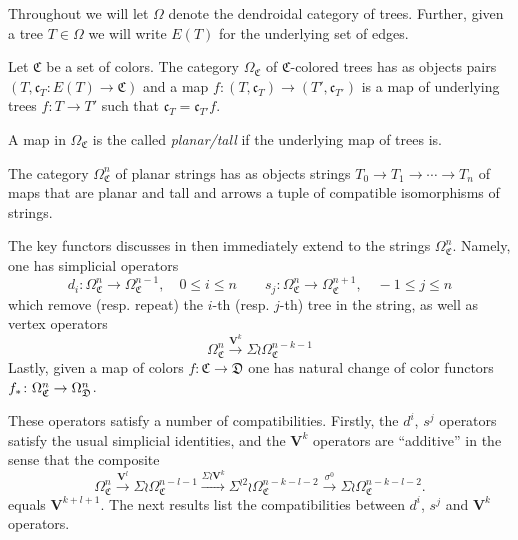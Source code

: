\documentclass[a4paper,10pt
,draft
]{article}%
\renewcommand{\1}{\eta}%
\begin{document}
Throughout we will let $\Omega$ denote the dendroidal category of trees.
Further, given a tree $T\in \Omega$ we will write 
$E(T)$ for the underlying set of edges.

\begin{definition}
Let $\mathfrak{C}$ be a set of colors.
The category $\Omega_{\mathfrak{C}}$ of $\mathfrak{C}$-colored trees has as objects pairs
$(T,\mathfrak{c}_T\colon E(T) \to \mathfrak{C})$ and a map
$f\colon (T,\mathfrak{c}_T) \to (T',\mathfrak{c}_{T'})$
is a map of underlying trees $f\colon T \to T'$
such that $\mathfrak{c}_T = \mathfrak{c}_{T'} f$.

A map in $\Omega_{\mathfrak{C}}$ is the called \textit{planar/tall} if the underlying map of trees is.

The category $\Omega_{\mathfrak{C}}^n$ of planar strings has as objects strings $T_0 \to T_1 \to \cdots \to T_n$ of maps that are planar and tall and arrows a tuple of compatible isomorphisms of strings.
\end{definition}


The key functors discusses in \cite{BP_geo} then immediately extend to the strings
$\Omega_{\mathfrak{C}}^n$. Namely, one has simplicial operators
\[
d_i \colon \Omega_{\mathfrak{C}}^n \to \Omega_{\mathfrak{C}}^{n-1},
\quad 0 \leq i \leq n
\qquad
s_j \colon \Omega_{\mathfrak{C}}^{n} \to \Omega_{\mathfrak{C}}^{n+1},
\quad -1 \leq j \leq n
\]
which remove (resp. repeat) the $i$-th (resp. $j$-th) tree in the string,
as well as vertex operators
\[
\Omega^{n}_{\mathfrak{C}}
\xrightarrow{\boldsymbol{V}^k}
\Sigma \wr \Omega^{n-k-1}_{\mathfrak{C}}
\]
Lastly, given a map of colors 
$f \colon \mathfrak{C} \to \mathfrak{D}$
one has natural change of color functors
$f_{\**} \colon \Omega^n_{\mathfrak{C}} \to \Omega^n_{\mathfrak{D}}$.



These operators satisfy a number of compatibilities. Firstly, the $d^i$, $s^j$ operators satisfy the usual simplicial identities, 
and the $\boldsymbol{V}^k$ operators are ``additive'' in the sense that
the composite
\begin{equation}\label{VKADD EQ}
	\Omega^{n}_{\mathfrak{C}} \xrightarrow{\boldsymbol{V}^l} 
	\Sigma \wr \Omega^{n-l-1}_{\mathfrak{C}} \xrightarrow{\Sigma \wr \boldsymbol{V}^k}
	\Sigma^{\wr 2} \wr \Omega^{n-k-l-2}_{\mathfrak{C}} \xrightarrow{\sigma^0}
	\Sigma \wr \Omega^{n-k-l-2}_{\mathfrak{C}}.
\end{equation}
equals $\boldsymbol{V}^{k+l+1}$.
The next results list the compatibilities between $d^i$, $s^j$ and $\boldsymbol{V}^k$ operators.
\end{document}
